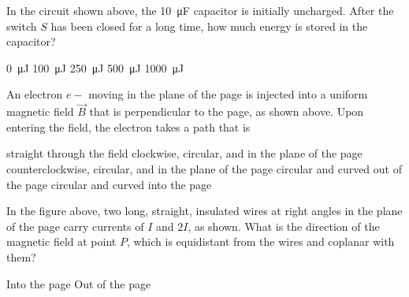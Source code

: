 \documentclass[12pt]{../oss-classkick-exam}
\begin{document}
\begin{questions}
  \question In the circuit shown above, the \SI{10}{\micro\farad} capacitor is
  initially uncharged. After the switch $S$ has been closed for a long time,
  how much energy is stored in the capacitor?
  \begin{choices}
    \choice\SI{0}{\micro\joule}
    \choice\SI{100}{\micro\joule}
    \choice\SI{250}{\micro\joule}
    \choice\SI{500}{\micro\joule}
    \choice\SI{1000}{\micro\joule}
  \end{choices}
  \newpage

  \question An electron $e-$ moving in the plane of the page is injected into a
  uniform magnetic field $\vec B$ that is perpendicular to the page, as shown
  above. Upon entering the field, the electron takes a path that is
  \begin{choices}
    \choice straight through the field
    \choice clockwise, circular, and in the plane of the page
    \choice counterclockwise, circular, and in the plane of the page
    \choice circular and curved out of the page
    \choice circular and curved into the page
  \end{choices}
  
  \question In the figure above, two long, straight, insulated wires at right
  angles in the plane of the page carry currents of $I$ and $2I$, as shown.
  What is the direction of the magnetic field at point $P$, which is
  equidistant from the wires and coplanar with them?
  \begin{choices}
    \choice Into the page
    \choice Out of the page
    \choice {\huge$\searrow$}
    \choice {\huge$\nwarrow$}
    \choice {\huge$\nearrow$}
  \end{choices}
  

\end{questions}
\end{document}
